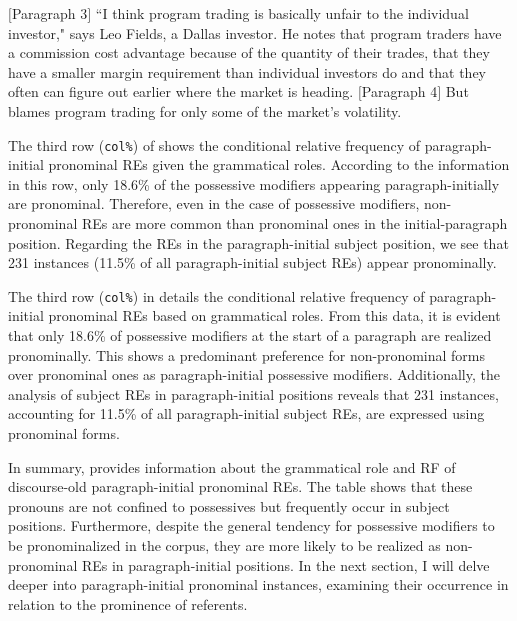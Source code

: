 \begin{exe}
	\ex \example{wsj-0121}
	\begin{xlist}
		\ex $[$Paragraph 3$]$ ``I think program trading is basically unfair to the individual investor," says Leo Fields, a Dallas investor. He notes that program traders have a commission cost advantage because of the quantity of their trades, that they have a smaller margin requirement than individual investors do and that they often can figure out earlier where the market is heading.
		\ex\label{ex:fieldsposs} $[$Paragraph 4$]$ But  blames program trading for only some of the market's volatility.
	\end{xlist}
\end{exe}

The third row (\texttt{col\%}) of  shows the conditional relative frequency of paragraph-initial pronominal REs given the grammatical roles. According to the information in this row, only 18.6\% of the possessive modifiers appearing paragraph-initially are pronominal. Therefore, even in the case of possessive modifiers, non-pronominal REs are more common than pronominal ones in the initial-paragraph position. Regarding the REs in the paragraph-initial subject position, we see that 231 instances (11.5\% of all paragraph-initial subject REs) appear pronominally. 

The third row (\texttt{col\%}) in  details the conditional relative frequency of paragraph-initial pronominal REs based on grammatical roles. From this data, it is evident that only 18.6\% of possessive modifiers at the start of a paragraph are realized pronominally. This shows a predominant preference for non-pronominal forms over pronominal ones as paragraph-initial possessive modifiers. Additionally, the analysis of subject REs in paragraph-initial positions reveals that 231 instances, accounting for 11.5\% of all paragraph-initial subject REs, are expressed using pronominal forms. 

In summary,  provides information about the grammatical role and RF of discourse-old paragraph-initial pronominal REs. The table shows that these pronouns are not confined to possessives but frequently occur in subject positions. Furthermore, despite the general tendency for possessive modifiers to be pronominalized in the \wsj corpus, they are more likely to be realized as non-pronominal REs in paragraph-initial positions. In the next section, I will delve deeper into paragraph-initial pronominal instances, examining their occurrence in relation to the prominence of referents. 

